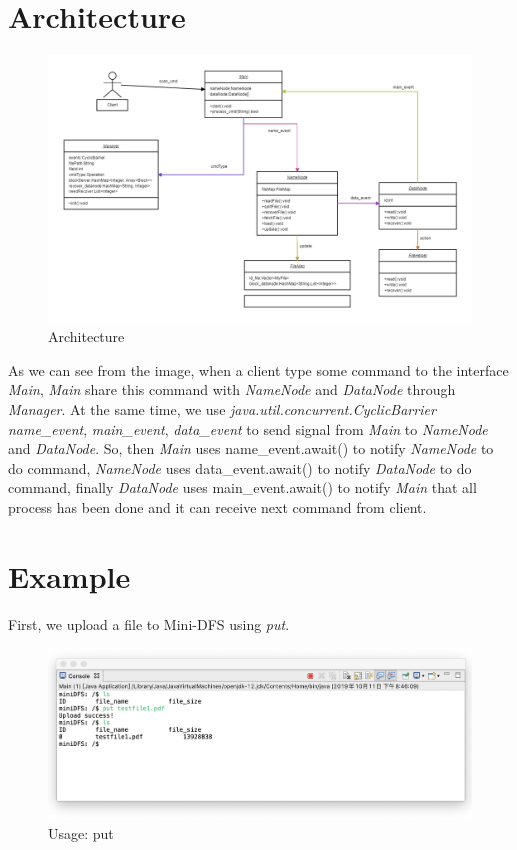 \documentclass[10pt]{article}
\begin{document}
\section{Architecture}

\begin{figure}[H]
\centerline{\includegraphics[width = 1\textwidth]{screenshot//process.png}}
\caption{Architecture}
\label{fig_process}
\end{figure}

As we can see from the image, when a client type some command to the interface \textit{Main}, \textit{Main} share this command with \textit{NameNode} and \textit{DataNode} through \textit{Manager}. At the same time, we use \textit{java.util.concurrent.CyclicBarrier} \textit{name\_event}, \textit{main\_event}, \textit{data\_event} to send signal from \textit{Main} to \textit{NameNode} and \textit{DataNode}. So, then \textit{Main} uses name\_event.await() to notify \textit{NameNode} to do command, \textit{NameNode} uses data\_event.await() to notify \textit{DataNode} to do command, finally \textit{DataNode} uses main\_event.await() to notify \textit{Main} that all process has been done and it can receive next command from client.

\section{Example}

First, we upload a file to Mini-DFS using \textit{put}.

\begin{figure}[H]
\centerline{\includegraphics[width = 1\textwidth]{screenshot//put_01.png}}
\caption{Usage: put}
\end{figure}
\end{document}
